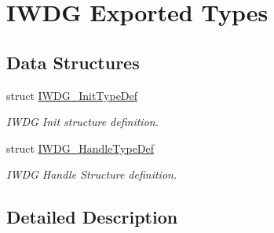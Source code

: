\hypertarget{group___i_w_d_g___exported___types}{}\section{I\+W\+DG Exported Types}
\label{group___i_w_d_g___exported___types}
\subsection*{Data Structures}
\begin{DoxyCompactItemize}
\item 
struct \hyperlink{struct_i_w_d_g___init_type_def}{I\+W\+D\+G\+\_\+\+Init\+Type\+Def}
\begin{DoxyCompactList}\small\item\em I\+W\+DG Init structure definition. \end{DoxyCompactList}\item 
struct \hyperlink{struct_i_w_d_g___handle_type_def}{I\+W\+D\+G\+\_\+\+Handle\+Type\+Def}
\begin{DoxyCompactList}\small\item\em I\+W\+DG Handle Structure definition. \end{DoxyCompactList}\end{DoxyCompactItemize}


\subsection{Detailed Description}
